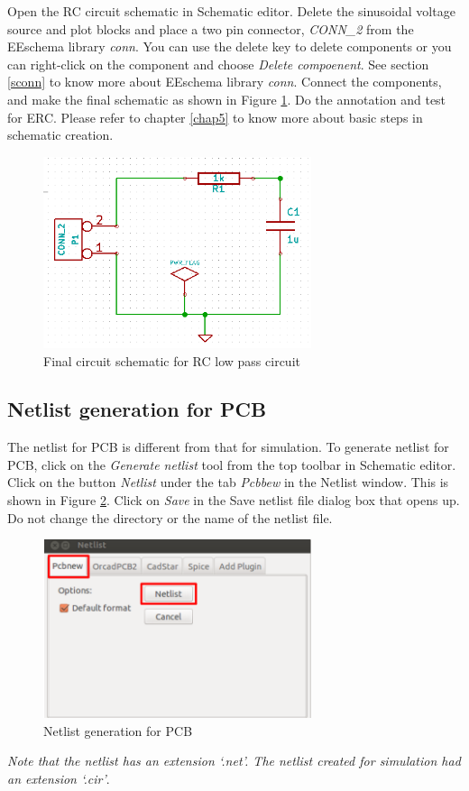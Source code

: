 Open the RC circuit schematic in Schematic editor. Delete the sinusoidal voltage source and plot blocks and place a two pin connector, \textit{CONN\_2} from the EEschema library \textit{conn}. You can use the delete key to delete components or you can right-click on the component and choose \textit{Delete compoenent}. See section \ref{sconn} to know more about EEschema library \textit{conn}. Connect the components, and make the final schematic as shown in Figure \ref{pcbschfin}. Do the annotation and test for ERC. Please refer to chapter \ref{chap5} to know more about basic steps in schematic creation.
\begin{figure}
\centering
\includegraphics[width=0.7\textwidth]{figures/pcbschfin}
\caption{Final circuit schematic for RC low pass circuit}
\label{pcbschfin}
\end{figure}
\subsection{Netlist generation for PCB}
\label{netc}
The netlist for PCB is different from that for simulation. To generate netlist for PCB, click on the \textit{Generate netlist} tool from the top toolbar in Schematic editor. Click on the button \textit{Netlist} under the tab \textit{Pcbbew} in the Netlist window. This is shown in Figure \ref{netlistpcb}. Click on \textit{Save} in the Save netlist file dialog box that opens up. Do not change the directory or the name of the netlist file. 

\begin{figure}
\centering
\includegraphics[width=0.7\textwidth]{figures/netlistpcb}
\caption{Netlist generation for PCB}
\label{netlistpcb}
\end{figure}
\textit{Note that the netlist has an extension `.net'. The netlist created for simulation had an extension `.cir'}.

